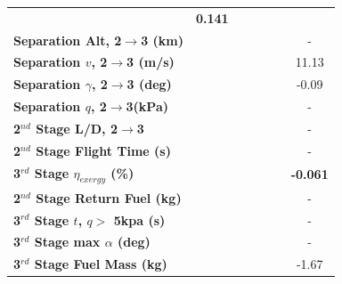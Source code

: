 \begin{table}[ht]
\begin{tabular}{l c c c c c c}
	& \textbf{0.141}
	\\
	\textbf{Separation Alt, 2$\rightarrow$3 (km)}
	& \secondthirdSeparationAltIspNinety
	& \secondthirdSeparationAltIspNinetyFive
	& \secondthirdSeparationAltIspStandard
	& \secondthirdSeparationAltIspOneHundredFive
	& \secondthirdSeparationAltIspOneHundredTen
	& -
	\\
	\textbf{Separation $v$, 2$\rightarrow$3 (m/s)}
	& \secondthirdSeparationvIspNinety
	& \secondthirdSeparationvIspNinetyFive
	& \secondthirdSeparationvIspStandard
	& \secondthirdSeparationvIspOneHundredFive
	& \secondthirdSeparationvIspOneHundredTen
	&11.13
	\\
	\textbf{Separation $\gamma$, 2$\rightarrow$3 (deg)}
	& \secondthirdSeparationgammaIspNinety
	& \secondthirdSeparationgammaIspNinetyFive
	& \secondthirdSeparationgammaIspStandard
	& \secondthirdSeparationgammaIspOneHundredFive
	& \secondthirdSeparationgammaIspOneHundredTen
	&-0.09
	\\
	\textbf{Separation $q$, 2$\rightarrow$3(kPa)}
	& \secondthirdSeparationqIspNinety
	& \secondthirdSeparationqIspNinetyFive
	& \secondthirdSeparationqIspStandard
	& \secondthirdSeparationqIspOneHundredFive
	& \secondthirdSeparationqIspOneHundredTen
	& -
	\\
	\textbf{2$^{nd}$ Stage L/D, 2$\rightarrow$3}
	& \secondthirdSeparationLDIspNinety
	& \secondthirdSeparationLDIspNinetyFive
	& \secondthirdSeparationLDIspStandard
	& \secondthirdSeparationLDIspOneHundredFive
	& \secondthirdSeparationLDIspOneHundredTen
	& -
	\\
	\textbf{2$^{nd}$ Stage Flight Time (s)}
	& \secondFlightTimeIspNinety
	& \secondFlightTimeIspNinetyFive
	& \secondFlightTimeIspStandard
	& \secondFlightTimeIspOneHundredFive
	& \secondFlightTimeIspOneHundredTen
	& -
	\\
	\hline 
	\textbf{3$^{rd}$ Stage $\eta_{exergy}$ (\%)}
	& \textbf{\thirddExergyEffIspNinety}
	& \textbf{\thirddExergyEffIspNinetyFive}
	& \textbf{\thirddExergyEffIspStandard}
	& \textbf{\thirddExergyEffIspOneHundredFive}
	& \textbf{\thirddExergyEffIspOneHundredTen}
	& \textbf{-0.061}
	\\
	\textbf{2$^{nd}$ Stage Return Fuel (kg)}
	& \returnFuelIspNinety
	& \returnFuelIspNinetyFive
	& \returnFuelIspStandard
	& \returnFuelIspOneHundredFive
	& \returnFuelIspOneHundredTen
	& -
	\\
	\textbf{3$^{rd}$ Stage $t$, $q >$ 5kpa (s)}
	& \thirdqOverFiveIspNinety
	& \thirdqOverFiveIspNinetyFive
	& \thirdqOverFiveIspStandard
	& \thirdqOverFiveIspOneHundredFive
	& \thirdqOverFiveIspOneHundredTen
	& -
	\\
	\textbf{3$^{rd}$ Stage max $\alpha$ (deg)}
	& \thirdmaxAoAIspNinety
	& \thirdmaxAoAIspNinetyFive
	& \thirdmaxAoAIspStandard
	& \thirdmaxAoAIspOneHundredFive
	& \thirdmaxAoAIspOneHundredTen
	& -
	\\
	\textbf{3$^{rd}$ Stage Fuel Mass (kg)}
	& \thirdmFuelIspNinety
	& \thirdmFuelIspNinetyFive
	& \thirdmFuelIspStandard
	& \thirdmFuelIspOneHundredFive
	& \thirdmFuelIspOneHundredTen
	&-1.67
	\\
	\hline 
\end{tabular} 

\end{table}

